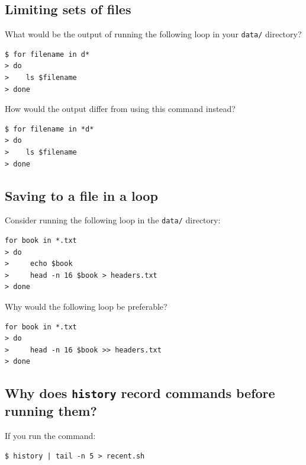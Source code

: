 \documentclass[
]{krantz}
\begin{document}
\hypertarget{bash-tools-ex-limiting-file-sets}{%
\subsection{Limiting sets of files}\label{bash-tools-ex-limiting-file-sets}}

What would be the output of running the following loop in your \texttt{data/} directory?

\begin{verbatim}
$ for filename in d*
> do
>    ls $filename
> done
\end{verbatim}

How would the output differ from using this command instead?

\begin{verbatim}
$ for filename in *d*
> do
>    ls $filename
> done
\end{verbatim}

\hypertarget{bash-tools-ex-loop-save}{%
\subsection{Saving to a file in a loop}\label{bash-tools-ex-loop-save}}

Consider running the following loop in the \texttt{data/} directory:

\begin{verbatim}
for book in *.txt
> do
>     echo $book
>     head -n 16 $book > headers.txt
> done
\end{verbatim}

Why would the following loop be preferable?

\begin{verbatim}
for book in *.txt
> do
>     head -n 16 $book >> headers.txt
> done
\end{verbatim}

\hypertarget{bash-tools-ex-history-order}{%
\subsection{\texorpdfstring{Why does \texttt{history} record commands before running them?}{Why does history record commands before running them?}}\label{bash-tools-ex-history-order}}

If you run the command:

\begin{verbatim}
$ history | tail -n 5 > recent.sh
\end{verbatim}
\end{document}
